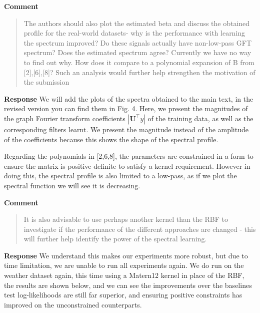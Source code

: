 \documentclass[11pt,onecolumn,journal]{IEEEtran}
\theoremstyle{definition}
\begin{document}
\textbf{Comment}
\begin{quote}
The authors should also plot the estimated beta and discuss the obtained profile for the real-world datasets- why is the performance with learning the spectrum improved? Do these signals actually have non-low-pass GFT spectrum? Does the estimated spectrum agree? Currently we have no way to find out why. How does it compare to a polynomial expansion of B from [2],[6],[8]? Such an analysis would further help strengthen the motivation of the submission
\end{quote}

\textbf{Response}
We will add the plots of the spectra obtained to the main text, in the revised version you can find them in Fig. 4. Here, we present the magnitudes of the graph Fourier transform coefficients $|\mathbf{U}^\top y|$ of the training data, as well as the corresponding filters learnt. We present the magnitude instead of the amplitude of the coefficients because this shows the shape of the spectral profile.

Regarding the polynomials in [2,6,8], the parameters are constrained in a form to ensure the matrix is positive definite to satisfy a kernel requirement. However in doing this, the spectral profile is also limited to a low-pass, as if we plot the spectral function we will see it is decreasing.

\textbf{Comment}
\begin{quote}
    It is also advisable to use perhaps another kernel than the RBF to investigate if the performance of the different approaches are changed - this will further help identify the power of the spectral learning.
\end{quote}

\textbf{Response}
We understand this makes our experiments more robust, but due to time limitation, we are unable to run all experiments again. We do run on the weather dataset again, this time using a Matern12 kernel in place of the RBF, the results are shown below, and we can see the improvements over the baselines test log-likelihoods are still far superior, and ensuring positive constraints has improved on the unconstrained counterparts.
\end{document}
